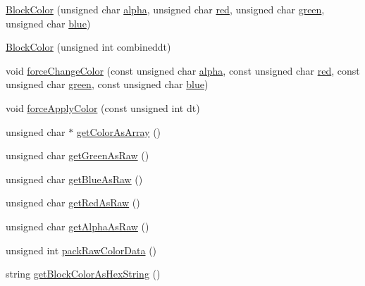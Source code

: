 \begin{DoxyCompactItemize}
\item 
\hyperlink{class_tetris_1_1_block_sub_modules_1_1_block_color_abb929df07c6b378e31d76b7298eb9e12}{Block\+Color} (unsigned char \hyperlink{class_tetris_1_1_block_sub_modules_1_1_block_color_af0983ea684f33617a0b482cfea1d3c2b}{alpha}, unsigned char \hyperlink{class_tetris_1_1_block_sub_modules_1_1_block_color_af8a0dc372e7dbab300290eadada8ef49}{red}, unsigned char \hyperlink{class_tetris_1_1_block_sub_modules_1_1_block_color_a4b28885bfd8bf53793c6b3daedd974eb}{green}, unsigned char \hyperlink{class_tetris_1_1_block_sub_modules_1_1_block_color_af04e78b9a1c2f7625863c289c4a741e3}{blue})
\item 
\hyperlink{class_tetris_1_1_block_sub_modules_1_1_block_color_aba62c9da4cb4b43caa871452a34790a9}{Block\+Color} (unsigned int combineddt)
\item 
void \hyperlink{class_tetris_1_1_block_sub_modules_1_1_block_color_ae6d640629b11d880ca994923657adbe1}{force\+Change\+Color} (const unsigned char \hyperlink{class_tetris_1_1_block_sub_modules_1_1_block_color_af0983ea684f33617a0b482cfea1d3c2b}{alpha}, const unsigned char \hyperlink{class_tetris_1_1_block_sub_modules_1_1_block_color_af8a0dc372e7dbab300290eadada8ef49}{red}, const unsigned char \hyperlink{class_tetris_1_1_block_sub_modules_1_1_block_color_a4b28885bfd8bf53793c6b3daedd974eb}{green}, const unsigned char \hyperlink{class_tetris_1_1_block_sub_modules_1_1_block_color_af04e78b9a1c2f7625863c289c4a741e3}{blue})
\item 
void \hyperlink{class_tetris_1_1_block_sub_modules_1_1_block_color_a260b5dd85cdf3145be7564dc2c0ee53d}{force\+Apply\+Color} (const unsigned int dt)
\item 
unsigned char $\ast$ \hyperlink{class_tetris_1_1_block_sub_modules_1_1_block_color_ac626961ee3894d89a7fc961e9f40c92f}{get\+Color\+As\+Array} ()
\item 
unsigned char \hyperlink{class_tetris_1_1_block_sub_modules_1_1_block_color_a65e9230325a2f44aa433f39c199aabcd}{get\+Green\+As\+Raw} ()
\item 
unsigned char \hyperlink{class_tetris_1_1_block_sub_modules_1_1_block_color_ac0ad44a8b001f3824447d137357f5145}{get\+Blue\+As\+Raw} ()
\item 
unsigned char \hyperlink{class_tetris_1_1_block_sub_modules_1_1_block_color_a1795cf70c847d261645a9690afff7e9c}{get\+Red\+As\+Raw} ()
\item 
unsigned char \hyperlink{class_tetris_1_1_block_sub_modules_1_1_block_color_acb1c9b34ee534857741025bd2824201a}{get\+Alpha\+As\+Raw} ()
\item 
unsigned int \hyperlink{class_tetris_1_1_block_sub_modules_1_1_block_color_a849ebbb0e900c5efdcb99784767e7a7a}{pack\+Raw\+Color\+Data} ()
\item 
string \hyperlink{class_tetris_1_1_block_sub_modules_1_1_block_color_a79cc837f207645628542876997c9e919}{get\+Block\+Color\+As\+Hex\+String} ()
\end{DoxyCompactItemize}
